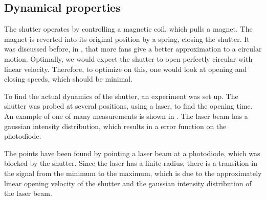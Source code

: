 \newpage
\subsection{Dynamical properties}
The shutter operates by controlling a magnetic coil, which pulls a magnet. The magnet is reverted into its original position by a spring, closing the shutter. 
It was discussed before, in , that more fans give a better approximation to a circular motion. Optimally, we would expect the shutter to open perfectly circular with linear velocity. Therefore, to optimize on this, one would look at opening and closing speeds, which should be minimal.

\label{subsec:shutter_dynamical}

To find the actual dynamics of the shutter, an experiment was set up. The shutter was probed at several positions, using a laser, to find the opening time. An example of one of many measurements is shown in . The laser beam has a gaussian intensity distribution, which results in a error function on the photodiode.

The points have been found by pointing a laser beam at a photodiode, which was blocked by the shutter. Since the laser has a finite radius, there is a transition in the signal from the minimum to the maximum, which is due to the approximately linear opening velocity of the shutter and the gaussian intensity distribution of the laser beam.

